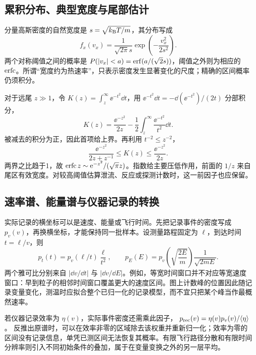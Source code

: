 \subsection{累积分布、典型宽度与尾部估计}
分量高斯密度的自然宽度是 $s=\sqrt{k_{\mathrm B} T/m}$，其分布写成
\[
 f_x(v_x)=\frac1{\sqrt{2\pi}s}
 \exp\!\left(-\frac{v_x^2}{2s^2}\right).
\]
两个对称阈值之间的概率是
$P(|v_x|<a)=\operatorname{erf}(a/(\sqrt2s))$，阈值之外则为相应的 $\operatorname{erfc}$。所谓“宽度约为热速率”，只表示密度发生显著变化的尺度；精确的区间概率仍须积分。

对于远尾 $z\gg1$，令 $K(z)=\int_z^\infty\ee^{-t^2}\dd t$，用 $\ee^{-t^2}\dd t=-\dd(\ee^{-t^2})/(2t)$ 分部积分，
\[
 K(z)=\frac{\ee^{-z^2}}{2z}
 -\frac12\int_z^\infty\frac{\ee^{-t^2}}{t^2}\dd t.
\]
被减去的积分为正，因此首项给上界。再利用 $t^{-2}\le z^{-2}$，
\[
 \frac{\ee^{-z^2}}{2z+z^{-1}}
 \le K(z)\le\frac{\ee^{-z^2}}{2z}.
\]
两界之比趋于1，故
$\operatorname{erfc} z\sim\mathrm e^{-z^2}/(\sqrt\pi z)$。指数给主要压低作用，前面的 $1/z$ 来自尾区有效宽度。对较高阈值估算泄流、反应或探测计数时，这一前因子也应保留。

\subsection{速率谱、能量谱与仪器记录的转换}
实际记录的横坐标可以是速度、能量或飞行时间。先把记录事件的密度写成 $p_v(v)$，再换横坐标，才能保持同一批样本。设测量路程固定为 $\ell$，到达时间 $t=\ell/v$，则
\[
 p_t(t)=p_v(\ell/t)\frac{\ell}{t^2},\qquad
 p_E(E)=p_v\!\left(\sqrt{\frac{2E}{m}}\right)
 \frac1{\sqrt{2mE}}.
\]
两个雅可比分别来自 $\left|\dd v/\dd t\right|$ 与
$\left|\dd v/\dd E\right|$。例如，等宽时间窗口并不对应等宽速度窗口：早到粒子的相邻时间窗口覆盖更大的速度区间。图上计数峰的位置因此随记录变量变化，测温时应拟合整个已归一化的记录模型，而不宜只把某个峰当作最概然速率。

若仪器记录效率为 $\eta(v)$，实际事件密度还需乘此因子，
$p_{\rm rec}(v)=\eta(v)p_v(v)/\langle\eta\rangle$。
反推出原谱时，可以在效率非零的区域除去该权重并重新归一化；效率为零的区间没有记录信息，单凭已测区间无法恢复其概率。有限飞行路径分散和有限时间分辨率则引入不同初始条件的叠加，属于在变量变换之外的另一层平均。

